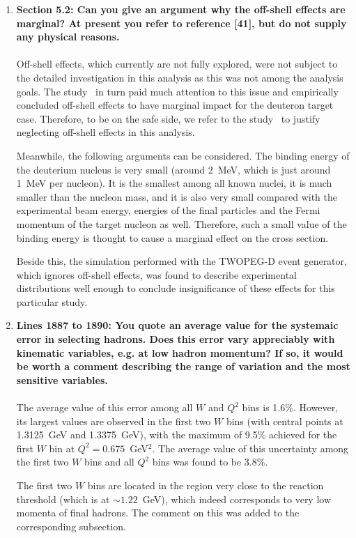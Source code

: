 \documentclass[,superscriptaddress,showpacs,amssymb,amsmath,amsfonts,linenumbers,article]{revtex4-1}
\begin{document}
\begin{enumerate}[label=\textbf{\arabic*}.]
\item {\bf Section 5.2: Can you give an argument why the off-shell effects are marginal? At present you refer to reference [41], but do not supply any physical reasons.}\\ \\
Off-shell effects, which currently are not fully explored, were not subject to the detailed investigation in this analysis as this was not among the analysis goals. The study~\cite{Ye_Tian:2017} in turn paid much attention to this issue and empirically concluded off-shell effects to have marginal impact for the deuteron target case. Therefore, to be on the safe side, we refer to the study~\cite{Ye_Tian:2017} to justify neglecting off-shell effects in this analysis.

Meanwhile, the following arguments can be considered. The binding energy of the deuterium nucleus is very small (around 2~MeV, which is just around 1~MeV per nucleon). It is the smallest among all known nuclei, it is much smaller than the nucleon mass, and it is also very small compared with the experimental beam energy, energies of the final particles and the Fermi momentum of the target nucleon as well. Therefore, such a small value of the binding energy is thought to cause a marginal effect on the cross section.

Beside this, the simulation performed with the TWOPEG-D event generator, which ignores off-shell effects, was found to describe experimental distributions well enough to conclude insignificance of these effects for this particular study.



\item {\bf Lines 1887 to 1890: You quote an average value for the systemaic error in selecting hadrons. Does this error vary appreciably with kinematic variables, e.g. at low hadron momentum? If so, it would be worth a comment describing the range of variation and the most sensitive variables.}\\ \\
The average value of this error among all $W$ and $Q^{2}$ bins is 1.6\%. However, its largest values are observed in the first two $W$ bins (with central points at 1.3125~GeV and 1.3375~GeV), with the maximum of 9.5\% achieved for the first $W$ bin at $Q^{2} = 0.675$~GeV$^{2}$. The average value of this uncertainty among the first two $W$ bins and all $Q^{2}$ bins was found to be 3.8\%.

The first two $W$ bins are located in the region very close to the reaction threshold (which is at $\sim 1.22$~GeV), which indeed corresponds to very low momenta of final hadrons. The comment on this was added to the corresponding subsection.


\end{enumerate}
\end{document}
